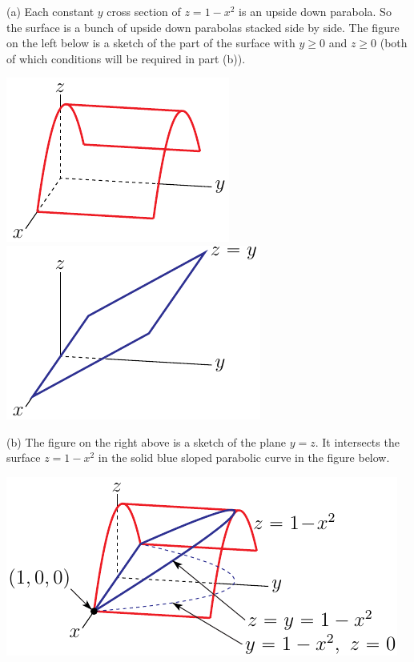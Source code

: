 \begin{solution}
(a)
Each constant $y$ cross section of $z=1-x^2$ is an upside
down parabola. So the surface is a bunch of upside down parabolas
stacked side by side. The figure on the left below is a sketch of 
the part of the surface with $y\ge 0$
and $z\ge 0$ (both of which conditions will be required in part (b)).

\begin{center}
     \includegraphics{fig/OE13D_8.pdf}\qquad
     \includegraphics{fig/OE13D_8b1.pdf}
\end{center}

(b)
The figure on the right above is a sketch of the plane $y=z$.
It intersects the surface $z=1-x^2$ in the solid blue sloped parabolic
curve in the figure below.

\begin{center}
     \includegraphics{fig/OE13D_8b3.pdf}
\end{center}


\end{solution}
